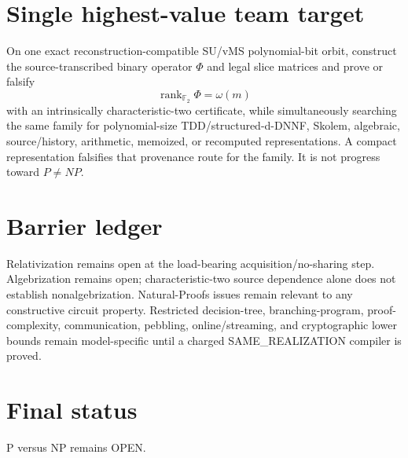 \documentclass[11pt]{article}
\begin{document}
\section*{Single highest-value team target}
On one exact reconstruction-compatible SU/vMS polynomial-bit orbit, construct the source-transcribed binary operator \(\Phi\) and legal slice matrices and prove or falsify
\[
\boxed{\operatorname{rank}_{\mathbb F_2}\Phi=\omega(m)}
\]
with an intrinsically characteristic-two certificate, while simultaneously searching the same family for polynomial-size TDD/structured-d-DNNF, Skolem, algebraic, source/history, arithmetic, memoized, or recomputed representations. A compact representation falsifies that provenance route for the family. It is not progress toward \(P\neq NP\).

\section*{Barrier ledger}
Relativization remains open at the load-bearing acquisition/no-sharing step. Algebrization remains open; characteristic-two source dependence alone does not establish nonalgebrization. Natural-Proofs issues remain relevant to any constructive circuit property. Restricted decision-tree, branching-program, proof-complexity, communication, pebbling, online/streaming, and cryptographic lower bounds remain model-specific until a charged SAME_REALIZATION compiler is proved.

\section*{Final status}
P versus NP remains OPEN.

\end{document}

